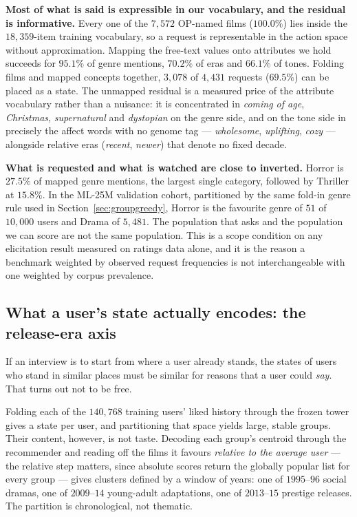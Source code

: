 \documentclass[11pt]{article}
\begin{document}
\textbf{Most of what is said is expressible in our vocabulary, and the residual is informative.}
Every one of the $7{,}572$ OP-named films ($100.0\%$) lies inside the $18{,}359$-item training
vocabulary, so a request is representable in the action space without approximation. Mapping the
free-text values onto attributes we hold succeeds for $95.1\%$ of genre mentions, $70.2\%$ of eras
and $66.1\%$ of tones. Folding films and mapped concepts together, $3{,}078$ of $4{,}431$ requests
($69.5\%$) can be placed as a state. The unmapped residual is a measured price of the attribute
vocabulary rather than a nuisance: it is concentrated in \emph{coming of age}, \emph{Christmas},
\emph{supernatural} and \emph{dystopian} on the genre side, and on the tone side in precisely the
affect words with no genome tag --- \emph{wholesome}, \emph{uplifting}, \emph{cozy} --- alongside
relative eras (\emph{recent}, \emph{newer}) that denote no fixed decade.

\textbf{What is requested and what is watched are close to inverted.} Horror is $27.5\%$ of mapped
genre mentions, the largest single category, followed by Thriller at $15.8\%$. In the ML-25M
validation cohort, partitioned by the same fold-in genre rule used in
Section~\ref{sec:groupgreedy}, Horror is the favourite genre of $51$ of $10{,}000$ users and Drama of
$5{,}481$. The population that asks and the population we can score are not the same population.
This is a scope condition on any elicitation result measured on ratings data alone, and it is the
reason a benchmark weighted by observed request frequencies is not interchangeable with one weighted
by corpus prevalence.

\subsection{What a user's state actually encodes: the release-era axis}
\label{sec:era}

If an interview is to start from where a user already stands, the states of users who stand in
similar places must be similar for reasons that a user could \emph{say}. That turns out not to be
free.

Folding each of the $140{,}768$ training users' liked history through the frozen tower gives a
state per user, and partitioning that space yields large, stable groups. Their content, however, is
not taste. Decoding each group's centroid through the recommender and reading off the films it
favours \emph{relative to the average user} --- the relative step matters, since absolute scores
return the globally popular list for every group --- gives clusters defined by a window of years:
one of $1995$--$96$ social dramas, one of $2009$--$14$ young-adult adaptations, one of $2013$--$15$
prestige releases. The partition is chronological, not thematic.
\end{document}
